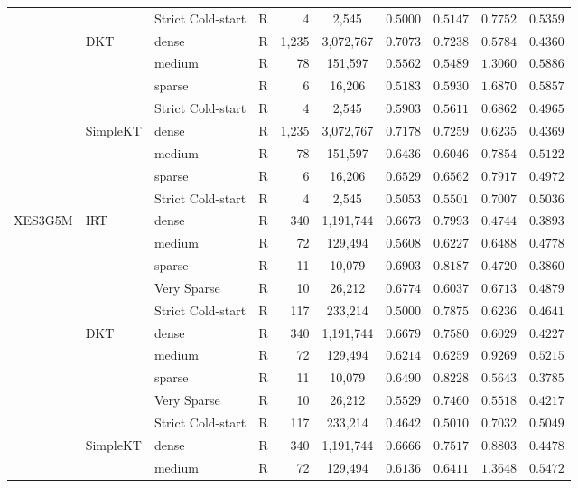 \begin{table}[htbp]
{\begin{tabular}{lllcrccccc}
 &  & Strict Cold-start & R & 4 & 2,545 & $0.5000$ & $0.5147$ & $0.7752$ & $0.5359$ \\
 & DKT & dense & R & 1,235 & 3,072,767 & $0.7073$ & $0.7238$ & $0.5784$ & $0.4360$ \\
 &  & medium & R & 78 & 151,597 & $0.5562$ & $0.5489$ & $1.3060$ & $0.5886$ \\
 &  & sparse & R & 6 & 16,206 & $0.5183$ & $0.5930$ & $1.6870$ & $0.5857$ \\
 &  & Strict Cold-start & R & 4 & 2,545 & $0.5903$ & $0.5611$ & $0.6862$ & $0.4965$ \\
 & SimpleKT & dense & R & 1,235 & 3,072,767 & $0.7178$ & $0.7259$ & $0.6235$ & $0.4369$ \\
 &  & medium & R & 78 & 151,597 & $0.6436$ & $0.6046$ & $0.7854$ & $0.5122$ \\
 &  & sparse & R & 6 & 16,206 & $0.6529$ & $0.6562$ & $0.7917$ & $0.4972$ \\
 &  & Strict Cold-start & R & 4 & 2,545 & $0.5053$ & $0.5501$ & $0.7007$ & $0.5036$ \\
\midrule
XES3G5M & IRT & dense & R & 340 & 1,191,744 & $0.6673$ & $0.7993$ & $0.4744$ & $0.3893$ \\
 &  & medium & R & 72 & 129,494 & $0.5608$ & $0.6227$ & $0.6488$ & $0.4778$ \\
 &  & sparse & R & 11 & 10,079 & $0.6903$ & $0.8187$ & $0.4720$ & $0.3860$ \\
 &  & Very Sparse & R & 10 & 26,212 & $0.6774$ & $0.6037$ & $0.6713$ & $0.4879$ \\
 &  & Strict Cold-start & R & 117 & 233,214 & $0.5000$ & $0.7875$ & $0.6236$ & $0.4641$ \\
 & DKT & dense & R & 340 & 1,191,744 & $0.6679$ & $0.7580$ & $0.6029$ & $0.4227$ \\
 &  & medium & R & 72 & 129,494 & $0.6214$ & $0.6259$ & $0.9269$ & $0.5215$ \\
 &  & sparse & R & 11 & 10,079 & $0.6490$ & $0.8228$ & $0.5643$ & $0.3785$ \\
 &  & Very Sparse & R & 10 & 26,212 & $0.5529$ & $0.7460$ & $0.5518$ & $0.4217$ \\
 &  & Strict Cold-start & R & 117 & 233,214 & $0.4642$ & $0.5010$ & $0.7032$ & $0.5049$ \\
 & SimpleKT & dense & R & 340 & 1,191,744 & $0.6666$ & $0.7517$ & $0.8803$ & $0.4478$ \\
 &  & medium & R & 72 & 129,494 & $0.6136$ & $0.6411$ & $1.3648$ & $0.5472$ \\

\end{tabular}}
\end{table}
